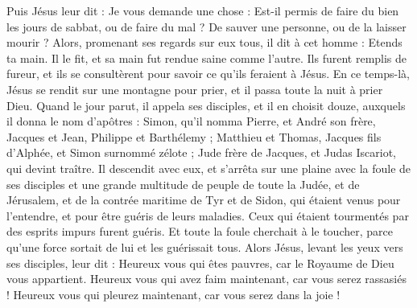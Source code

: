 \begin{multicols}{2}
Puis Jésus leur dit : Je vous demande une chose : Est-il permis de faire du bien les jours de sabbat, ou de faire du mal ? De sauver une personne, ou de la laisser mourir ?
Alors, promenant ses regards sur eux tous, il dit à cet homme : Etends ta main. Il le fit, et sa main fut rendue saine comme l'autre.
Ils furent remplis de fureur, et ils se consultèrent pour savoir ce qu’ils feraient à Jésus.
En ce temps-là, Jésus se rendit sur une montagne pour prier, et il passa toute la nuit à prier Dieu.
Quand le jour parut, il appela ses disciples, et il en choisit douze, auxquels il donna le nom d’apôtres :
Simon, qu'il nomma Pierre, et André son frère, Jacques et Jean, Philippe et Barthélemy ;
Matthieu et Thomas, Jacques fils d'Alphée, et Simon surnommé zélote ;
Jude frère de Jacques, et Judas Iscariot, qui devint traître.
Il descendit avec eux, et s'arrêta sur une plaine avec la foule de ses disciples et une grande multitude de peuple de toute la Judée, et de Jérusalem, et de la contrée maritime de Tyr et de Sidon, qui étaient venus pour l'entendre, et pour être guéris de leurs maladies.
Ceux qui étaient tourmentés par des esprits impurs furent guéris.
Et toute la foule cherchait à le toucher, parce qu’une force sortait de lui et les guérissait tous.
Alors Jésus, levant les yeux vers ses disciples, leur dit : Heureux vous qui êtes pauvres, car le Royaume de Dieu vous appartient.
Heureux vous qui avez faim maintenant, car vous serez rassasiés ! Heureux vous qui pleurez maintenant, car vous serez dans la joie !

\end{multicols}
